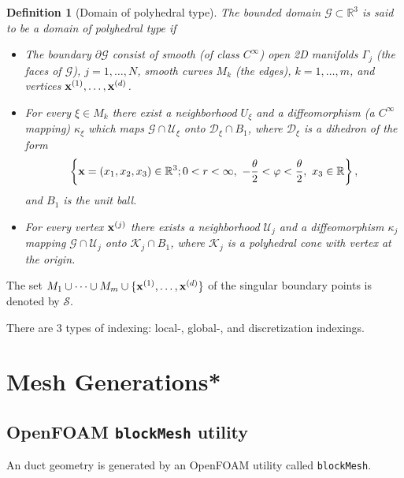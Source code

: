 \documentclass[oneside,11pt]{book}
\numberwithin{equation}{section}
\newtheorem{definition}{Definition}[section]
\begin{document}
\begin{definition}[Domain of polyhedral type]
    The bounded domain $\mathcal{G}\subset\mathbb{R}^3$ is said to be a \emph{domain of polyhedral type} if
    \begin{itemize}
        \item[(i)] The boundary $\partial\mathcal{G}$ consist of smooth (of class $C^\infty$) open 2D manifolds $\Gamma_j$ (the faces of $\mathcal{G}$), $j = 1,\ldots,N$, smooth curves $M_k$ (the edges), $k = 1,\ldots,m$, and vertices ${\bf x}^{(1)},\ldots,{\bf x}^{(d)}$.
        \item[(ii)] For every $\xi\in M_k$ there exist a neighborhood $U_\xi$ and a diffeomorphism (a $C^\infty$ mapping) $\kappa_\xi$ which maps $\mathcal{G}\cap\mathcal{U}_\xi$ onto $\mathcal{D}_\xi\cap B_1$, where $\mathcal{D}_\xi$ is a dihedron of the form 
        \begin{align*}
            \left\{{\bf x} = (x_1,x_2,x_3)\in\mathbb{R}^3;0 < r < \infty,\ -\frac{\theta}{2} < \varphi < \frac{\theta}{2},\ x_3\in\mathbb{R}\right\},
        \end{align*}
        and $B_1$ is the unit ball.
        \item[(iii)] For every vertex ${\bf x}^{(j)}$ there exists a neighborhood $\mathcal{U}_j$ and a diffeomorphism $\kappa_j$ mapping $\mathcal{G}\cap\mathcal{U}_j$ onto $\mathcal{K}_j\cap B_1$, where $\mathcal{K}_j$ is a polyhedral cone with vertex at the origin.
    \end{itemize}
\end{definition}
The set $M_1\cup\cdots\cup M_m\cup\{{\bf x}^{(1)},\ldots,{\bf x}^{(d)}\}$ of the singular boundary points is denoted by $\mathcal{S}$.

There are 3 types of indexing: local-, global-, and discretization indexings.

\section{Mesh Generations*}

\subsection{OpenFOAM \texttt{blockMesh} utility}
An duct geometry is generated by an OpenFOAM utility called \texttt{blockMesh}.



\end{document}
